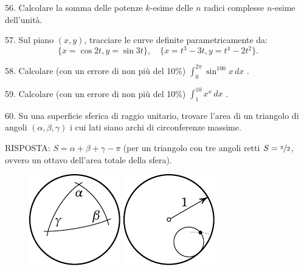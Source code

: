 \begin{problem}{56.}
	Calcolare la somma delle potenze $k$-esime delle $n$ radici complesse $n$-esime dell'unità.   
\end{problem}

\begin{problem}{57.}
Sul piano $(x,y)$, tracciare le curve definite parametricamente da:
	\begin{equation*}
		\{x=\cos 2t, y=\sin 3t\},\quad 
		\{x=t^3-3t, y=t^4-2t^2\}.
	\end{equation*}
	\vspace{-2\baselineskip}%
\end{problem}

\begin{problem}{58.}
	Calcolare (con un errore di non più del 10\%)
 $\int_0^{2\pi} \sin^{100} x\,dx$ .
\end{problem}

\begin{problem}{59.}
	Calcolare (con un errore di non più del 10\%)  $\int_1^{10} x^x\,dx$ .
\end{problem}

\begin{problem}{60.}
	Su una superficie sferica di raggio unitario, trovare l’area di un triangolo di angoli $(\alpha, \beta, \gamma)$ i cui lati siano archi di circonferenze massime.

	\begin{note}{RISPOSTA:}
		$S=\alpha+\beta+\gamma-\pi$ (per un triangolo con tre angoli retti  $S=\nicefrac{\pi}{2}$, ovvero un ottavo dell’area totale della sfera).
		\begin{figure}
			\null\hfill
			\includegraphics{resources/taskbook-44}
			\hfill
			\includegraphics{resources/taskbook-45}
			\hfill\null
		\end{figure}
	\end{note}
\end{problem}

